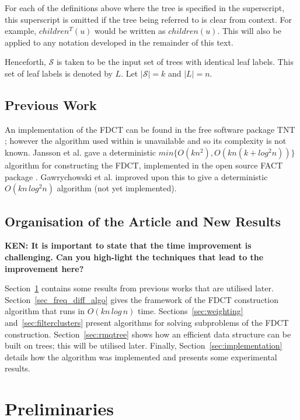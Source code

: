 \documentclass[final,1p,times]{elsarticle}
\begin{document}
    For each of the definitions above where the tree is specified in the superscript, this superscript is omitted if the tree being referred to is clear from context. For example, $children^T(u)$ would be written as $children(u)$. This will also be applied to any notation developed in the remainder of this text.

    Henceforth, $\mathcal{S}$ is taken to be the input set of trees with identical leaf labels. This set of leaf labels is denoted by $L$. Let $|\mathcal{S}| = k$ and $|L| = n$.

    \subsection{Previous Work}
    \label{subsec:previouswork}

    An implementation of the FDCT can be found in the free software package TNT \cite{goloboff2008tnt}; however the algorithm used within is unavailable and so its complexity is not known. Jansson et al. \cite{jansson2018algorithms} gave a deterministic $min\{O(kn^2), O(kn(k + log^2 n))\}$ algorithm for constructing the FDCT, implemented in the open source FACT package \cite{jansson2016improved}. Gawrychowski et al. \cite{gawrychowski2017faster} improved upon this to give a deterministic $O(kn\,log^2n)$ algorithm (not yet implemented).

    \subsection{Organisation of the Article and New Results}

    {\bf KEN: It is important to state that the time improvement is challenging. Can you high-light the techniques that lead to the improvement here?}

    Section~\ref{sec:preliminaries} contains some results from previous works that are utilised later. 
    Section~\ref{sec_freq_diff_algo} gives the framework of the FDCT construction algorithm that runs in $O(kn\,log\,n)$ time.
    Sections~\ref{sec:weighting} and~\ref{sec:filterclusters} present algorithms for solving subproblems of the FDCT construction.
    Section~\ref{sec:rmqtree} shows how an efficient data structure can be built on trees; this will be utilised later. 
    Finally, Section~\ref{sec:implementation} details how the algorithm was implemented and presents some experimental results.

    \section{Preliminaries}
    \label{sec:preliminaries}
\end{document}
